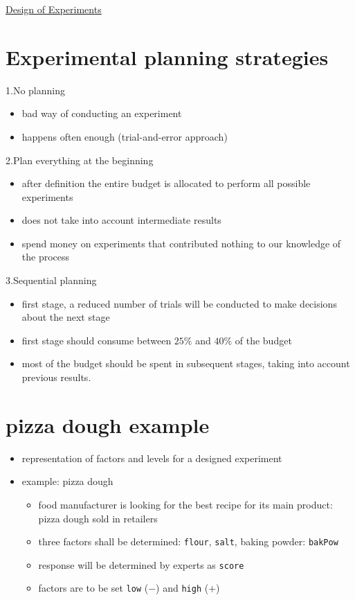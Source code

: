 \documentclass[
  a4paper,
]{scrbook}
\providecommand{\tightlist}{%
  \setlength{\itemsep}{0pt}\setlength{\parskip}{0pt}}\usepackage{longtable,booktabs,array}
\begin{document}
\hyperref[DoE]{Design of Experiments}

\section{Experimental planning
strategies}\label{experimental-planning-strategies}

1.No planning

\begin{itemize}
\tightlist
\item
  bad way of conducting an experiment
\item
  happens often enough (trial-and-error approach)
\end{itemize}

2.Plan everything at the beginning

\begin{itemize}
\tightlist
\item
  after definition the entire budget is allocated to perform all
  possible experiments
\item
  does not take into account intermediate results
\item
  spend money on experiments that contributed nothing to our knowledge
  of the process
\end{itemize}

3.Sequential planning

\begin{itemize}
\tightlist
\item
  first stage, a reduced number of trials will be conducted to make
  decisions about the next stage
\item
  first stage should consume between \(25\%\) and \(40\%\) of the budget
\item
  most of the budget should be spent in subsequent stages, taking into
  account previous results.
\end{itemize}

\section{pizza dough example}\label{pizza-dough-example}

\begin{itemize}
\tightlist
\item
  representation of factors and levels for a designed experiment
\item
  example: pizza dough

  \begin{itemize}
  \tightlist
  \item
    food manufacturer is looking for the best recipe for its main
    product: pizza dough sold in retailers
  \item
    three factors shall be determined: \texttt{flour}, \texttt{salt},
    baking powder: \texttt{bakPow}
  \item
    response will be determined by experts as \texttt{score}
  \item
    factors are to be set \texttt{low} (\(-\)) and \texttt{high} (\(+\))
  \end{itemize}
\end{itemize}
\end{document}
